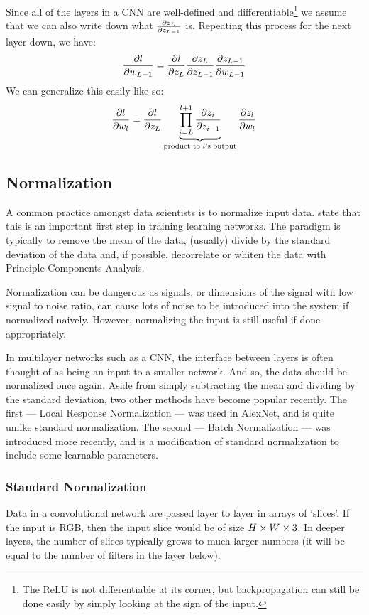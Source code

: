   Since all of the layers in a CNN are well-defined and
  differentiable\footnote{The ReLU is not differentiable at its corner, but
  backpropagation can still be done easily by simply looking at the sign of the
  input.} we assume that we can also write down what $\frac{\partial z_L}{\partial z_{L-1}}$ is.
  Repeating this process for the next layer down, we have:
  \begin{equation}
    \frac{\partial l}{\partial w_{L-1}}
    = \frac{\partial l}{\partial z_L}\frac{\partial z_L}{\partial z_{L-1}}\frac{\partial z_{L-1}}{\partial w_{L-1}}
  \end{equation}
  We can generalize this easily like so:
  \begin{equation}
    \frac{\partial l}{\partial w_{l}}
    = \frac{\partial l}{\partial z_L} \underbrace{\prod_{i=L}^{l+1}
    \frac{\partial z_i}{\partial z_{i-1}}}_{\text{product to $l$'s output}} 
    \frac{\partial z_{l}}{\partial w_{l}}
  \end{equation}

\subsection{Normalization}\label{sec:normalization}
  A common practice amongst data scientists is to normalize input data. 
  \citet{lecun_efficient_2012} state that this is an important first step in
  training learning networks. The paradigm is typically to remove the mean of
  the data, (usually) divide by the standard deviation of the data and, if
  possible, decorrelate or whiten the data with Principle Components Analysis. 

  Normalization can be dangerous as signals, or dimensions of the signal with 
  low signal to noise ratio, can cause lots of noise to be introduced into the
  system if normalized naively. However, normalizing the input is still useful if
  done appropriately.

  In multilayer networks such as a CNN, the interface between layers is often
  thought of as being an input to a smaller network. And so, the data should be
  normalized once again. Aside from simply subtracting the mean and
  dividing by the standard deviation, two other methods have become popular
  recently. The first --- Local Response Normalization --- was used in AlexNet, and
  is quite unlike standard normalization. The second --- Batch
  Normalization \citep{ioffe_batch_2015} --- was introduced more recently, and
  is a modification of standard normalization to include some learnable
  parameters.

\subsubsection{Standard Normalization}
      Data in a convolutional network are passed layer to layer in arrays of
      `slices'. If the input is RGB, then the input slice would be of size $H\times W\times
      3$. In deeper layers, the number of slices
      typically grows to much larger numbers (it will be equal to the number of
      filters in the layer below).
      
